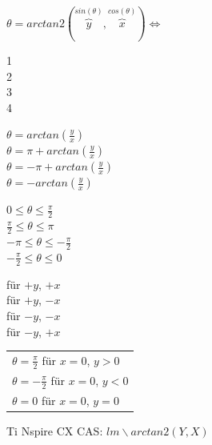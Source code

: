 	\begin{minipage}{5cm}
    	\vspace{9mm}
    	$\theta=arctan2(\overbrace{y}^{sin(\theta)},\overbrace{x}^{cos(\theta)}) \Leftrightarrow$
    \end{minipage}
	\begin{minipage}[t]{0.8cm}
    	\textcircled{1}\\
    	\textcircled{2}\\
    	\textcircled{3}\\
    	\textcircled{4}
    \end{minipage}
	\begin{minipage}[t]{3.5cm}
    	$\theta= arctan(\frac{y}{x})$\\
    	$\theta= \pi + arctan(\frac{y}{x})$\\
    	$\theta= -\pi + arctan(\frac{y}{x})$\\
    	$\theta= -arctan(\frac{y}{x})$\\
    \end{minipage}
	\begin{minipage}[t]{2.5cm}
    	\hspace{2mm} $0 \leq \theta \leq \frac{\pi}{2}$\\
    	\hspace*{1.5mm} $\frac{\pi}{2} \leq \theta \leq \pi$\\
    	$-\pi \leq \theta \leq -\frac{\pi}{2}$\\
    	$-\frac{\pi}{2} \leq \theta \leq 0$
    \end{minipage}
	\begin{minipage}[t]{2.5cm}
    	für $+y$, $+x$\\
    	für $+y$, $-x$\\
    	für $-y$, $-x$\\
    	für $-y$, $+x$
    \end{minipage}
	\begin{minipage}[t]{4cm}
     	\begin{tabular}[t]{|l}
    	$\theta = \frac{\pi}{2}$ für $x=0$, $y>0$\\
    	$\theta = - \frac{\pi}{2}$ für $x=0$, $y<0$\\
    	$\theta = 0$ für $x=0$, $y=0$\\
    	\end{tabular}
    \end{minipage}

Ti Nspire CX CAS: \texttt{$ lm\backslash arctan2(Y,X)$}
\clearpage

